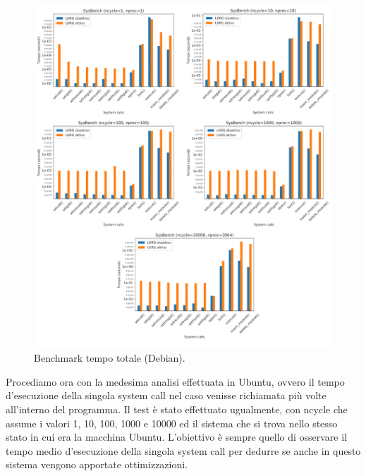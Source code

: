 \begin{figure}[!ht]
\centering
\includegraphics[scale=1.4]{Figures/Debian/Total}
\caption[Benchmark tempo totale (Debian)]{Benchmark tempo totale (Debian).}
\label{fig:totDebianFig}
\end{figure}

Procediamo ora con la medesima analisi effettuata in Ubuntu, ovvero il tempo d'esecuzione della singola system call nel caso venisse richiamata più volte all'interno del programma. Il test è stato effettuato ugualmente, con ncycle che assume i valori 1, 10, 100, 1000 e 10000 ed il sistema che si trova nello stesso stato in cui era la macchina Ubuntu. L'obiettivo è sempre quello di osservare il tempo medio d'esecuzione della singola system call per dedurre se anche in questo sistema vengono apportate ottimizzazioni.

